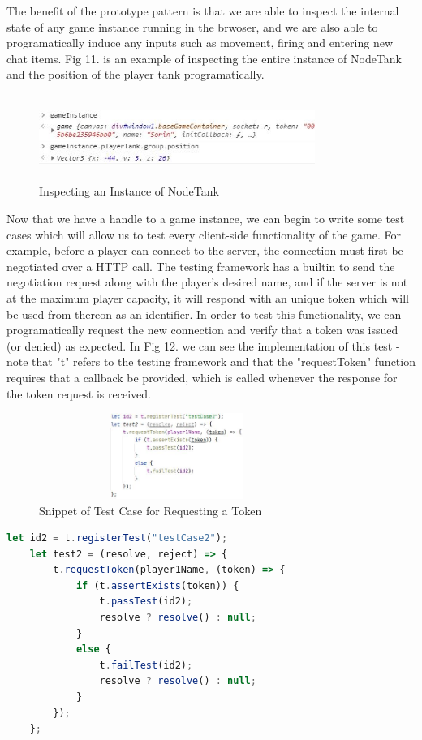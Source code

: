 \documentclass[conference]{IEEEtran}
\begin{document}
The benefit of the prototype pattern is that we are able to inspect the internal state of any game instance running in the brwoser, and we are also able to programatically induce 
any inputs such as movement, firing and entering new chat items. Fig 11. is an example of inspecting the entire instance of NodeTank and the position of the player tank programatically.

\begin{figure}[htbp]
\centerline{\includegraphics [width = 9cm, height = 2.8cm] {GameInspection.jpg}}
\caption{Inspecting an Instance of NodeTank}
\end{figure}

Now that we have a handle to a game instance, we can begin to write some test cases which will allow us to test every client-side functionality of the game. For example, before a player can
connect to the server, the connection must first be negotiated over a HTTP call. The testing framework has a builtin to send the negotiation request along with the player's desired name, and if the 
server is not at the maximum player capacity, it will respond with an unique token which will be used from thereon as an identifier. In order to test this functionality, we can programatically request
the new connection and verify that a token was issued (or denied) as expected. In Fig 12. we can see the implementation of this test - note that "t" refers to the testing framework and that the "requestToken"
function requires that a callback be provided, which is called whenever the response for the token request is received. 

\begin{figure}[htbp]
\centerline{\includegraphics [width = 9cm, height = 2.8cm] {TokenTestSnippet.jpg}}
\caption{Snippet of Test Case for Requesting a Token}
\end{figure}

\begin{lstlisting}[language=JavaScript]
    let id2 = t.registerTest("testCase2");
    let test2 = (resolve, reject) => {
        t.requestToken(player1Name, (token) => {
            if (t.assertExists(token)) {
                t.passTest(id2);
                resolve ? resolve() : null;
            }
            else {
                t.failTest(id2);
                resolve ? resolve() : null;
            }
        });
    };

\end{lstlisting}
\end{document}
